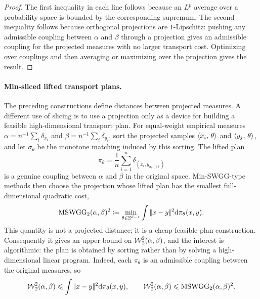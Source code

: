 \begin{proof}
	The first inequality in each line follows because an $L^p$ average over a probability space is bounded by the corresponding supremum. The second inequality follows because orthogonal projections are $1$-Lipschitz: pushing any admissible coupling between $\alpha$ and $\beta$ through a projection gives an admissible coupling for the projected measures with no larger transport cost. Optimizing over couplings and then averaging or maximizing over the projection gives the result.
\end{proof}

\paragraph{Min-sliced lifted transport plans.}

The preceding constructions define distances between projected measures. A different use of slicing is to use a projection only as a device for building a feasible high-dimensional transport plan. For equal-weight empirical measures $\alpha=n^{-1}\sum_i\delta_{x_i}$ and $\beta=n^{-1}\sum_i\delta_{y_i}$, sort the projected samples $\langle x_i,\,\theta\rangle$ and $\langle y_j,\,\theta\rangle$, and let $\sigma_\theta$ be the monotone matching induced by this sorting. The lifted plan
\[
	\pi_\theta
	=
	\frac1n\sum_{i=1}^n\delta_{(x_i,y_{\sigma_\theta(i)})}
\]
is a genuine coupling between $\alpha$ and $\beta$ in the original space. Min-SWGG-type methods then choose the projection whose lifted plan has the smallest full-dimensional quadratic cost,
\[
	\operatorname{MSWGG}_2(\alpha,\beta)^2
	\coloneqq
	\min_{\theta\in\mathbb{S}^{d-1}}
	\int|\!| x-y |\!|^2\mathrm{d}\pi_\theta(x,y).
\]
This quantity is not a projected distance; it is a cheap feasible-plan construction. Consequently it gives an upper bound on $\operatorname{\mathcal{W}}_2^2(\alpha,\beta)$, and the interest is algorithmic: the plan is obtained by sorting rather than by solving a high-dimensional linear program.
Indeed, each $\pi_\theta$ is an admissible coupling between the original measures, so
\[
	\operatorname{\mathcal{W}}_2^2(\alpha,\beta)
	\leqslant
	\int|\!| x-y |\!|^2\mathrm{d}\pi_\theta(x,y),
	\qquad
	\operatorname{\mathcal{W}}_2^2(\alpha,\beta)
	\leqslant
	\operatorname{MSWGG}_2(\alpha,\beta)^2.
\]

